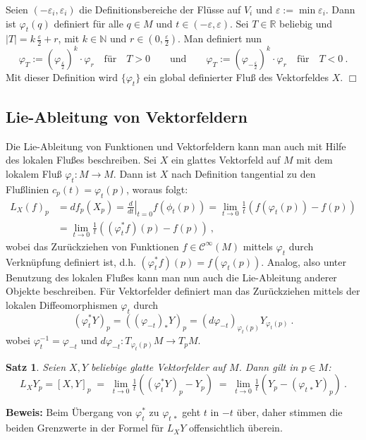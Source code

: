 \documentclass[12pt,a4paper]{article}
\def\R{\mathbb{R}}
\def\N{\mathbb{N}}
\newtheorem{Satz}[Lemma]{Satz}
\def\proof{\noindent\textbf{Beweis:}\quad}
\def\qed{\quad\hfill\ensuremath{\Box}}
\begin{document}
\medskip

Seien $(-\varepsilon_i, \varepsilon_i)$ die Definitionsbereiche der Fl\"usse auf $V_i$
und $\varepsilon:= \min \varepsilon_i$. Dann ist $\varphi_t(q)$ definiert f\"ur
alle $q\in M$ und $t\in (-\varepsilon, \varepsilon)$. Sei $T\in \R$ beliebig
und $|T| = k \,\frac{\varepsilon}{2}+r$, mit $k \in \N$ und $r\in (0,\frac{\varepsilon}{2})$.
Man definiert nun
$$
\varphi_T := (\varphi_{\frac{\varepsilon}{2}})^k\cdot \varphi_r \quad \mbox{f\"ur} \quad T>0
\qquad \mbox{und} \qquad
\varphi_T := (\varphi_{-\frac{\varepsilon}{2}})^k\cdot \varphi_r \quad \mbox{f\"ur} \quad T<0 \ .
$$
Mit dieser Definition wird $\{\varphi_t\}$ ein global definierter Flu\ss{} des Vektorfeldes $X$.
\qed

\bigskip

\subsection{Lie-Ableitung von Vektorfeldern}

Die Lie-Ableitung von Funktionen und Vektorfeldern kann man auch mit Hilfe des lokalen
Flu\ss es beschreiben. Sei $X$ ein glattes Vektorfeld auf $M$ mit dem lokalem Flu\ss{}
$\varphi_t : M \rightarrow M$. Dann ist $X$  nach Definition tangential zu den Flu\ss linien
$c_p(t) = \varphi_t(p)$, woraus folgt:
$$
\begin{array}{rl}
L_X(f)_p & = df_p(X_p) = \left. \frac{d}{dt}\right|_{t=0} f(\phi_t(p)) =
\lim_{t\rightarrow 0}\frac1t(f(\varphi_t(p))-f(p))\\[1ex]
&=
\lim_{t\rightarrow 0}\frac1t( (\varphi_t^* f)(p)-f(p)) \ ,
\end{array}
$$
wobei das  Zur\"uckziehen von Funktionen $f\in \mathcal C^\infty(M)$ mittels $\varphi_t$  durch
Verkn\"upfung definiert ist, d.h.
$(\varphi_t^*f)(p) = f(\varphi_t(p))$.
Analog, also unter Benutzung des lokalen Flu\ss es kann man nun auch die Lie-Ableitung anderer Objekte
beschreiben. F\"ur Vektorfelder definiert man das Zur\"uckziehen mittels der lokalen Diffeomorphismen
$\varphi_t$ durch
$$
(\varphi_t^*Y)_p = ((\varphi_{-t})_* Y)_p =
(d\varphi_{-t})_{\varphi_{t}(p)} Y_{\varphi_{t}(p)} \ .
$$
wobei $\varphi_t^{-1}=\varphi_{-t}$ und $d\varphi_{-t} : T_{\varphi_{t}(p)}M\rightarrow T_pM$.

\begin{Satz}
Seien $X,Y$ beliebige glatte Vektorfelder auf $M$. Dann gilt in $p\in M$:
$$
L_XY_p = [X,Y]_p \; = \; \lim_{t\rightarrow 0}\tfrac1t( (\varphi_t^*Y)_p - Y_p)
\; = \;
\lim_{t\rightarrow 0}\tfrac1t( Y_p - (\varphi_{t\,*} Y)_p )\ .
$$
\end{Satz}
\proof
Beim \"Ubergang von $\varphi_t^*$ zu $\varphi_{t\,*}$ geht $t$ in $-t$ \"uber, daher stimmen
die beiden Grenzwerte in der Formel f\"ur $L_XY$ offensichtlich \"uberein.
\end{document}
